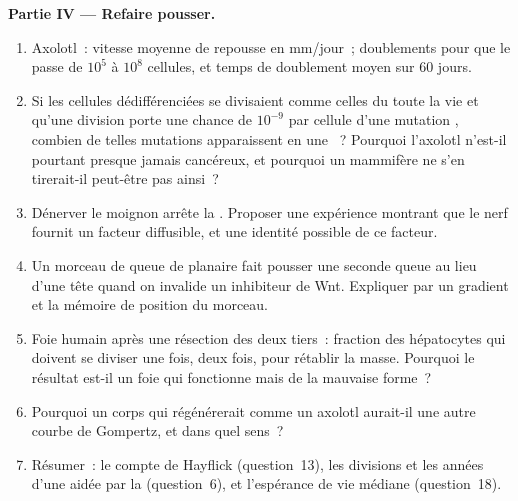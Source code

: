 \begin{problem}
\medskip
\noindent\textbf{Partie IV --- Refaire pousser.}
\begin{enumerate}[resume]
  \item Axolotl~: vitesse moyenne de repousse en mm/jour~; doublements
        pour que le  passe de $10^{5}$ à $10^{8}$ cellules, et
        temps de doublement moyen sur 60 jours.
  \item Si les cellules dédifférenciées se divisaient comme celles du
         toute la vie et qu'une division porte une chance de
        $10^{-9}$ par cellule d'une mutation , combien de telles
        mutations apparaissent en une ~? Pourquoi l'axolotl
        n'est-il pourtant presque jamais cancéreux, et pourquoi un
        mammifère ne s'en tirerait-il peut-être pas ainsi~?
  \item Dénerver le moignon arrête la . Proposer une
        expérience montrant que le nerf fournit un facteur diffusible, et
        une identité possible de ce facteur.
  \item Un morceau de queue de planaire fait pousser une seconde queue au
        lieu d'une tête quand on invalide un inhibiteur de Wnt.
        Expliquer par un gradient et la mémoire de position du morceau.
  \item Foie humain après une résection des deux tiers~: fraction des
        hépatocytes qui doivent se diviser une fois, deux fois, pour
        rétablir la masse. Pourquoi le résultat est-il un foie qui
        fonctionne mais de la mauvaise forme~?
  \item Pourquoi un corps qui régénérerait comme un axolotl aurait-il une
        autre courbe de Gompertz, et dans quel sens~?
  \item Résumer~: le compte de Hayflick (question~13), les divisions et
        les années d'une  aidée par la 
        (question~6), et l'espérance de vie médiane (question~18).
\end{enumerate}
\end{problem}
